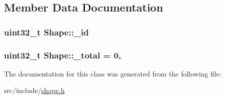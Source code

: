 \subsection{Member Data Documentation}
\hypertarget{class_shape_a5de5f48a04ef525d02a7d27b81a47c70}{
\subsubsection[{\-\_\-id}]{\setlength{\rightskip}{0pt plus 5cm}uint32\-\_\-t Shape\-::\-\_\-id\hspace{0.3cm}{\ttfamily [protected]}}}\label{class_shape_a5de5f48a04ef525d02a7d27b81a47c70}
\hypertarget{class_shape_ac4eb4a54d573863e093d46c707160aa5}{
\subsubsection[{\-\_\-total}]{\setlength{\rightskip}{0pt plus 5cm}uint32\-\_\-t Shape\-::\-\_\-total = 0\hspace{0.3cm}{\ttfamily [static]}, {\ttfamily [protected]}}}\label{class_shape_ac4eb4a54d573863e093d46c707160aa5}


The documentation for this class was generated from the following file\-:\begin{DoxyCompactItemize}
\item 
src/include/\hyperlink{shape_8h}{shape.\-h}\end{DoxyCompactItemize}
